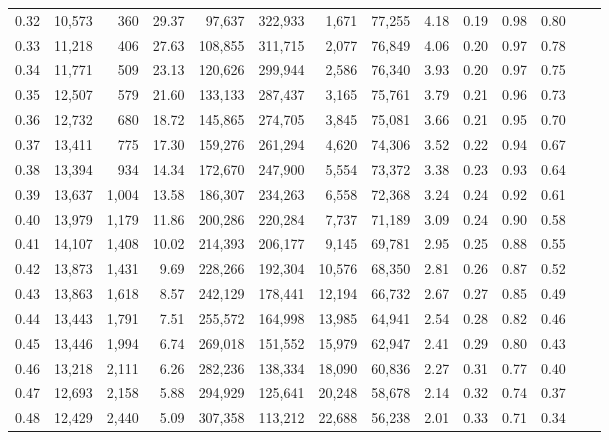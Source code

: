 \begin{tabular}{rrrrrrrrrrrrrr}
0.32 &  10,573 &    360 &   29.37 &   97,637 &  322,933 &   1,671 &  77,255 &  4.18 &  0.19 &  0.98 &      0.80 \\
0.33 &  11,218 &    406 &   27.63 &  108,855 &  311,715 &   2,077 &  76,849 &  4.06 &  0.20 &  0.97 &      0.78 \\
0.34 &  11,771 &    509 &   23.13 &  120,626 &  299,944 &   2,586 &  76,340 &  3.93 &  0.20 &  0.97 &      0.75 \\
0.35 &  12,507 &    579 &   21.60 &  133,133 &  287,437 &   3,165 &  75,761 &  3.79 &  0.21 &  0.96 &      0.73 \\
0.36 &  12,732 &    680 &   18.72 &  145,865 &  274,705 &   3,845 &  75,081 &  3.66 &  0.21 &  0.95 &      0.70 \\
0.37 &  13,411 &    775 &   17.30 &  159,276 &  261,294 &   4,620 &  74,306 &  3.52 &  0.22 &  0.94 &      0.67 \\
0.38 &  13,394 &    934 &   14.34 &  172,670 &  247,900 &   5,554 &  73,372 &  3.38 &  0.23 &  0.93 &      0.64 \\
0.39 &  13,637 &  1,004 &   13.58 &  186,307 &  234,263 &   6,558 &  72,368 &  3.24 &  0.24 &  0.92 &      0.61 \\
0.40 &  13,979 &  1,179 &   11.86 &  200,286 &  220,284 &   7,737 &  71,189 &  3.09 &  0.24 &  0.90 &      0.58 \\
0.41 &  14,107 &  1,408 &   10.02 &  214,393 &  206,177 &   9,145 &  69,781 &  2.95 &  0.25 &  0.88 &      0.55 \\
0.42 &  13,873 &  1,431 &    9.69 &  228,266 &  192,304 &  10,576 &  68,350 &  2.81 &  0.26 &  0.87 &      0.52 \\
0.43 &  13,863 &  1,618 &    8.57 &  242,129 &  178,441 &  12,194 &  66,732 &  2.67 &  0.27 &  0.85 &      0.49 \\
0.44 &  13,443 &  1,791 &    7.51 &  255,572 &  164,998 &  13,985 &  64,941 &  2.54 &  0.28 &  0.82 &      0.46 \\
0.45 &  13,446 &  1,994 &    6.74 &  269,018 &  151,552 &  15,979 &  62,947 &  2.41 &  0.29 &  0.80 &      0.43 \\
0.46 &  13,218 &  2,111 &    6.26 &  282,236 &  138,334 &  18,090 &  60,836 &  2.27 &  0.31 &  0.77 &      0.40 \\
0.47 &  12,693 &  2,158 &    5.88 &  294,929 &  125,641 &  20,248 &  58,678 &  2.14 &  0.32 &  0.74 &      0.37 \\
0.48 &  12,429 &  2,440 &    5.09 &  307,358 &  113,212 &  22,688 &  56,238 &  2.01 &  0.33 &  0.71 &      0.34 \\

\end{tabular}
